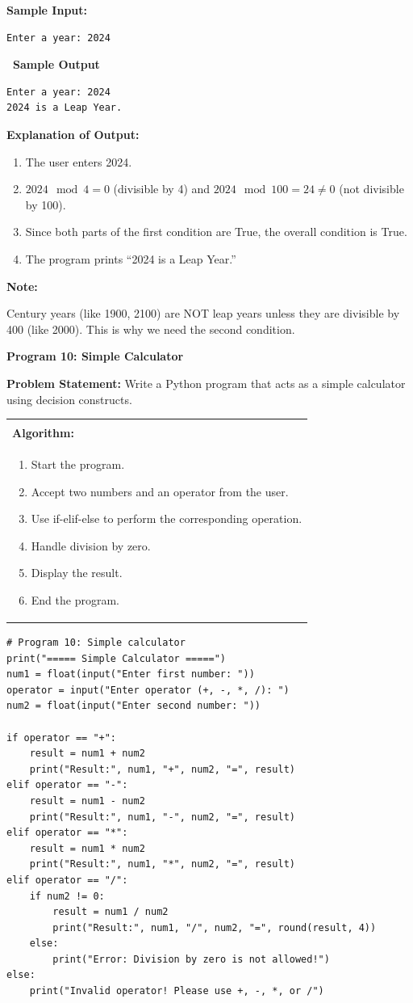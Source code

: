\documentclass[12pt,a4paper]{article}
\makeatletter
\newcommand{\outhead}{\noindent\colorbox{cmrgreen!25}%
  {\textbf{\small\color{cmrdark}~Sample Output~}}\par\vspace{-1pt}}
\newenvironment{notebox}{%
  \par\vspace{4pt}%
  \noindent\textbf{Note:}\par\vspace{2pt}%
  \begin{minipage}{\linewidth}%
  \small%
}{%
  \end{minipage}\par\vspace{4pt}%
}
\newenvironment{algobox}{%
  \par\vspace{4pt}%
  \noindent\begin{tabular}{@{}p{\linewidth}@{}}%
  \hline\\[-8pt]%
  \textbf{\color{blue!60!black}\small Algorithm:}\\[2pt]%
}{%
  \\[-4pt]\hline%
  \end{tabular}\par\vspace{4pt}%
}
\makeatother
\begin{document}
\textbf{Sample Input:}
\begin{verbatim}
Enter a year: 2024
\end{verbatim}

\outhead
\begin{lstlisting}[style=outputstyle]
Enter a year: 2024
2024 is a Leap Year.
\end{lstlisting}

\textbf{Explanation of Output:}
\begin{enumerate}
  \item The user enters 2024.
  \item $2024 \mod 4 = 0$ (divisible by 4) and $2024 \mod 100 = 24 \neq 0$ (not divisible by 100).
  \item Since both parts of the first condition are True, the overall condition is True.
  \item The program prints ``2024 is a Leap Year.''
\end{enumerate}

\begin{notebox}
Century years (like 1900, 2100) are NOT leap years unless they are divisible by 400 (like 2000). This is why we need the second condition.
\end{notebox}

\vspace{0.5cm}

\textbf{Program 10: Simple Calculator}

\textbf{Problem Statement:}
Write a Python program that acts as a simple calculator using decision constructs.

\begin{algobox}
\begin{enumerate}[label=Step \arabic*:]
  \item Start the program.
  \item Accept two numbers and an operator from the user.
  \item Use if-elif-else to perform the corresponding operation.
  \item Handle division by zero.
  \item Display the result.
  \item End the program.
\end{enumerate}
\end{algobox}

\begin{lstlisting}
# Program 10: Simple calculator
print("===== Simple Calculator =====")
num1 = float(input("Enter first number: "))
operator = input("Enter operator (+, -, *, /): ")
num2 = float(input("Enter second number: "))

if operator == "+":
    result = num1 + num2
    print("Result:", num1, "+", num2, "=", result)
elif operator == "-":
    result = num1 - num2
    print("Result:", num1, "-", num2, "=", result)
elif operator == "*":
    result = num1 * num2
    print("Result:", num1, "*", num2, "=", result)
elif operator == "/":
    if num2 != 0:
        result = num1 / num2
        print("Result:", num1, "/", num2, "=", round(result, 4))
    else:
        print("Error: Division by zero is not allowed!")
else:
    print("Invalid operator! Please use +, -, *, or /")
\end{lstlisting}
\end{document}
